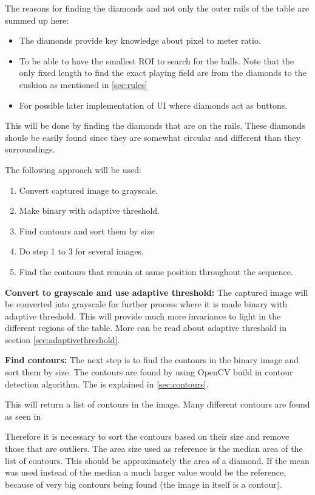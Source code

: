 The reasons for finding the diamonds and not only the outer rails of the table are summed up here:

\begin{itemize}
	\item The diamonds provide key knowledge about pixel to meter ratio.
	\item To be able to have the smallest ROI to search for the balls. Note that the only fixed length to find the exact playing field are from the diamonds to the cushion as mentioned in \ref{sec:rules}
	\item For possible later implementation of UI where diamonds act as buttons.
\end{itemize}

This will be done by finding the diamonds that are on the rails. These diamonds shoule be easily found since they are somewhat circular and different than they surroundings. 

The following approach will be used:
\begin{enumerate}
\item Convert captured image to grayscale.
\item Make binary with adaptive threshold.
\item Find contours and sort them by size
\item Do step 1 to 3 for several images.
\item Find the contours that remain at same position throughout the sequence.
\end{enumerate}

\textbf{Convert to grayscale and use adaptive threshold:}
The captured image will be converted into grayscale for further process where it is made binary with adaptive threshold. This will provide much more invariance to light in the different regions of the table. More can be read about adaptive threshold in section \ref{sec:adaptivethreshold}.

\textbf{Find contours:}
The next step is to find the contours in the binary image and sort them by size. The contours are found by using OpenCV build in contour detection algorithm. The is explained in \ref{sec:contours}.

This will return a list of contours in the image. Many different contours are found as seen in %

Therefore it is necessary to sort the contours based on their size and remove those that are outliers. The area size used as reference is the median area of the list of contours. This should be approximately the area of a diamond. If the mean was used instead of the median a much larger value would be the reference, because of very big contours being found (the image in itself is a contour).


